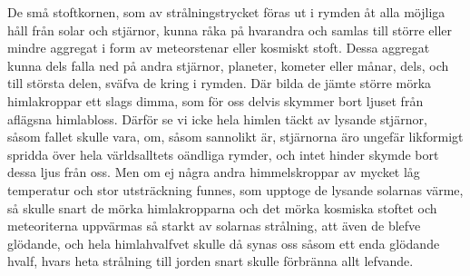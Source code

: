 \documentclass[a4paper, 12pt, oneside, swedish]{article}
\begin{document}
De små stoftkornen, som av strålningstrycket föras ut i rymden åt alla möjliga håll från solar och stjärnor, kunna råka på hvarandra och samlas till större eller mindre aggregat i form av meteorstenar eller kosmiskt stoft. Dessa aggregat kunna dels falla ned på andra stjärnor, planeter, kometer eller månar, dels, och till största delen, sväfva de kring i rymden. Där bilda de jämte större mörka himlakroppar ett slags dimma, som för oss delvis skymmer bort ljuset från aflägsna himlabloss. Därför se vi icke hela himlen täckt av lysande stjärnor, såsom fallet skulle vara, om, såsom sannolikt är, stjärnorna äro ungefär likformigt spridda över hela världsalltets oändliga rymder, och intet hinder skymde bort dessa ljus från oss. Men om ej några andra himmelskroppar av mycket låg temperatur och stor utsträckning funnes, som upptoge de lysande solarnas värme, så skulle snart de mörka himlakropparna och det mörka kosmiska stoftet och meteoriterna uppvärmas så starkt av solarnas strålning, att även de blefve glödande, och hela himlahvalfvet skulle då synas oss såsom ett enda glödande hvalf, hvars heta strålning till jorden snart skulle förbränna allt lefvande.
\end{document}
